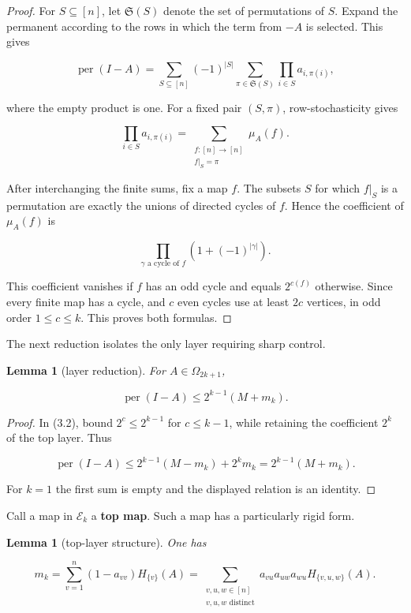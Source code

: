 \documentclass[11pt]{article}
\newtheorem{lemma}[theorem]{Lemma}
\theoremstyle{remark}
\begin{document}
\begin{proof}
For $S\subseteq[n]$, let $\mathfrak S(S)$ denote the set of
permutations of $S$. Expand the permanent according to the rows in which the
term from $-A$ is selected. This gives

\[
\operatorname{per}(I-A)
=\sum_{S\subseteq[n]}(-1)^{|S|}
\sum_{\pi\in\mathfrak S(S)}\prod_{i\in S}a_{i,\pi(i)},
\tag{3.3}
\]

where the empty product is one. For a fixed pair $(S,\pi)$,
row-stochasticity gives

\[
\prod_{i\in S}a_{i,\pi(i)}
=\sum_{\substack{f:[n]\to[n]\\f|_S=\pi}}\mu_A(f).
\tag{3.4}
\]

After interchanging the finite sums, fix a map $f$. The subsets $S$ for
which $f|_S$ is a permutation are exactly the unions of directed cycles of
$f$. Hence the coefficient of $\mu_A(f)$ is

\[
\prod_{\gamma\text{ a cycle of }f}
\left(1+(-1)^{|\gamma|}\right).
\tag{3.5}
\]

This coefficient vanishes if $f$ has an odd cycle and equals $2^{c(f)}$
otherwise. Since every finite map has a cycle, and $c$ even cycles use at
least $2c$ vertices, in odd order $1\le c\le k$. This proves both formulas.
\end{proof}

The next reduction isolates the only layer requiring sharp control.

\begin{lemma}[layer reduction]
For $A\in\Omega_{2k+1}$,

\[
\operatorname{per}(I-A)\le2^{k-1}(M+m_k).
\tag{3.6}
\]

\end{lemma}

\begin{proof}
In (3.2), bound $2^c\le2^{k-1}$ for $c\le k-1$, while retaining
the coefficient $2^k$ of the top layer. Thus

\[
\operatorname{per}(I-A)
\le2^{k-1}(M-m_k)+2^k m_k
=2^{k-1}(M+m_k).
\]

For $k=1$ the first sum is empty and the displayed relation is an identity.
\end{proof}

Call a map in $\mathcal E_k$ a \textbf{top map}. Such a map has a particularly
rigid form.

\begin{lemma}[top-layer structure]
One has

\[
m_k
=\sum_{v=1}^n(1-a_{vv})H_{\{v\}}(A)
=\sum_{\substack{v,u,w\in[n]\\v,u,w\text{ distinct}}}
a_{vu}a_{uw}a_{wu}H_{\{v,u,w\}}(A).
\tag{3.7}
\]

\end{lemma}
\end{document}
